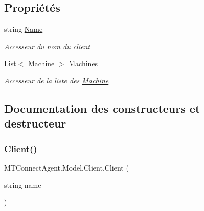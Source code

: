 \subsection*{Propriétés}
\begin{DoxyCompactItemize}
\item 
string \mbox{\hyperlink{class_m_t_connect_agent_1_1_model_1_1_client_ad3cab431fa147d3fbbd8ba015d6928bc}{Name}}
\begin{DoxyCompactList}\small\item\em Accesseur du nom du client \end{DoxyCompactList}\item 
List$<$ \mbox{\hyperlink{class_m_t_connect_agent_1_1_model_1_1_machine}{Machine}} $>$ \mbox{\hyperlink{class_m_t_connect_agent_1_1_model_1_1_client_a99571f570e22af5b1555ad37c2aa6d06}{Machines}}
\begin{DoxyCompactList}\small\item\em Accesseur de la liste des \mbox{\hyperlink{class_m_t_connect_agent_1_1_model_1_1_machine}{Machine}} \end{DoxyCompactList}\end{DoxyCompactItemize}


\subsection{Documentation des constructeurs et destructeur}
\mbox{\label{class_m_t_connect_agent_1_1_model_1_1_client_ad2d781a6f230ec83ccee4f7221a5a577}} 
\subsubsection{\texorpdfstring{Client()}{Client()}\hspace{0.1cm}{\footnotesize\ttfamily [1/3]}}
{\footnotesize\ttfamily M\+T\+Connect\+Agent.\+Model.\+Client.\+Client (\begin{DoxyParamCaption}\item[{string}]{name }\end{DoxyParamCaption})\hspace{0.3cm}{\ttfamily [inline]}}






